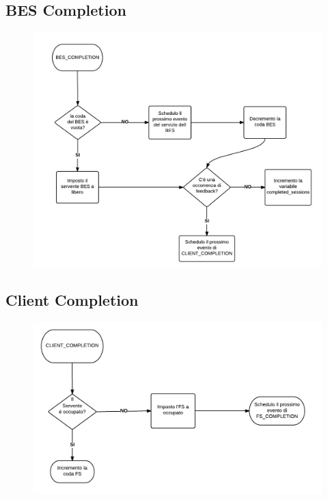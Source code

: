 \subsection{BES Completion}
\begin{figure}[H]
  \centering
  \includegraphics[scale=0.40]{img/BES_Completion.png}
  \label{fig:FS_Completion}
\end{figure}

\subsection{Client Completion}
\begin{figure}[H]
  \centering
  \includegraphics[scale=0.45]{img/CLIENT_Completion.png}
  \label{fig:FS_Completion}
\end{figure}

